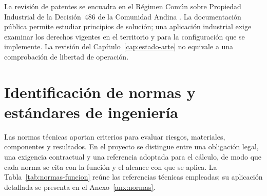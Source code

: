 La revisión de patentes se encuadra en el Régimen Común sobre Propiedad Industrial de la Decisión~486 de la Comunidad Andina \cite{can486}. La documentación pública permite estudiar principios de solución; una aplicación industrial exige examinar los derechos vigentes en el territorio y para la configuración que se implemente. La revisión del Capítulo~\ref{cap:estado-arte} no equivale a una comprobación de libertad de operación.

\section{Identificación de normas y estándares de ingeniería}

Las normas técnicas aportan criterios para evaluar riesgos, materiales, componentes y resultados. En el proyecto se distingue entre una obligación legal, una exigencia contractual y una referencia adoptada para el cálculo, de modo que cada norma se cita con la función y el alcance con que se aplica. La Tabla~\ref{tab:normas-funcion} reúne las referencias técnicas empleadas; su aplicación detallada se presenta en el Anexo~\ref{anx:normas}.

